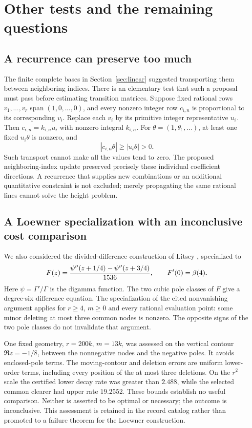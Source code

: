 \section{Other tests and the remaining questions}\label{sec:conclusions}
\subsection{A recurrence can preserve too much}
The finite complete bases in Section~\ref{sec:linear} suggested
transporting them between neighboring indices. There is an elementary
test that such a proposal must pass before estimating transition
matrices. Suppose fixed rational rows $v_1,\ldots,v_r$ span
$(1,0,\ldots,0)$, and every nonzero integer row $c_{i,n}$ is proportional
to its corresponding $v_i$. Replace each $v_i$ by its primitive integer
representative $u_i$. Then $c_{i,n}=k_{i,n}u_i$ with nonzero integral
$k_{i,n}$. For $\theta=(1,\theta_1,\ldots)$, at least one fixed
$u_i\theta$ is nonzero, and
\[
 |c_{i,n}\theta|\geq|u_i\theta|>0.
\]
Such transport cannot make all the values tend to zero. The proposed
neighboring-index update preserved precisely these individual
coefficient directions. A recurrence that supplies new combinations
or an additional quantitative constraint is not excluded; merely
propagating the same rational lines cannot solve the height problem.

\subsection{A Loewner specialization with an inconclusive cost comparison}
We also considered the divided-difference construction of Litsey
\cite{Litsey}, specialized to
\[
 F(z)=\frac{\psi''(z+1/4)-\psi''(z+3/4)}{1536},
 \qquad F'(0)=\beta(4).
\]
Here $\psi=\Gamma'/\Gamma$ is the digamma function.
The two cubic pole classes of $F$ give a degree-six difference equation.
The specialization of the cited nonvanishing argument applies for
$r\geq4$, $m\geq0$ and every rational evaluation point: some minor
deleting at most three common nodes is nonzero. The opposite signs
of the two pole classes do not invalidate that argument.

One fixed geometry, $r=200k$, $m=13k$, was assessed on the vertical
contour $\Re z=-1/8$, between the nonnegative nodes and the negative
poles. It avoids enclosed-pole terms. The
moving-contour and deletion errors are uniform lower-order terms,
including every position of the at most three deletions. On the
$r^2$ scale the certified lower decay rate was greater than $2.488$,
while the selected common clearer had upper rate $19.2552$.
These bounds establish no useful comparison. Neither is asserted to
be optimal or necessary; the outcome is inconclusive. This assessment
is retained in the record catalog rather than promoted to a failure
theorem for the Loewner construction.

